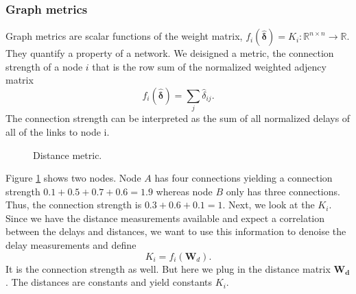 \documentclass[12pt,a4paper,english]{article}
\begin{document}
\subsubsection{Graph metrics}
Graph metrics are scalar functions of the weight matrix, $f_i(\bm{\hat{\delta}})=K_i: \mathbb{R}^{n \times n}\rightarrow \mathbb{R}$. They quantify a property of a network. We deisigned a metric, the connection strength of a node $i$ that is the row sum of the normalized weighted adjency matrix 
\begin{equation}
f_i (\bm{\hat{\delta}})= \sum_j{\hat{\delta}_{ij}}.  
\end{equation}
The connection strength can be interpreted as the sum of all normalized delays of all of the links to node i.

\begin{figure}[htb]
\centering
{}
\caption{Distance metric.} \label{fig:1}
\end{figure}
Figure \ref{fig:1} shows two nodes. Node $A$ has four connections yielding a connection strength $0.1+0.5+0.7+0.6=1.9$ whereas node $B$ only has three connections. Thus, the connection strength is $0.3+0.6+0.1=1$. Next, we look at the $K_i$. Since we have the distance measurements available and expect a correlation between the delays and distances, we want to use this information to denoise the delay measurements and define
\begin{equation}
K_i=f_i(\bm W_d).
\end{equation}
It is the connection strength as well. But here we plug in the distance matrix $\bm{W_d}$. The distances are constants and yield constants $K_i$.
\end{document}

